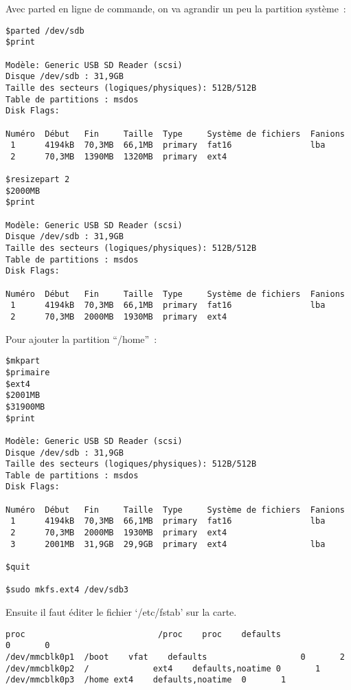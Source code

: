 Avec parted en ligne de commande, on va agrandir un peu la partition système~:
\begin{verbatim}
$parted /dev/sdb
$print

Modèle: Generic USB SD Reader (scsi)
Disque /dev/sdb : 31,9GB
Taille des secteurs (logiques/physiques): 512B/512B
Table de partitions : msdos
Disk Flags: 

Numéro  Début   Fin     Taille  Type     Système de fichiers  Fanions
 1      4194kB  70,3MB  66,1MB  primary  fat16                lba
 2      70,3MB  1390MB  1320MB  primary  ext4

$resizepart 2
$2000MB
$print

Modèle: Generic USB SD Reader (scsi)
Disque /dev/sdb : 31,9GB
Taille des secteurs (logiques/physiques): 512B/512B
Table de partitions : msdos
Disk Flags: 

Numéro  Début   Fin     Taille  Type     Système de fichiers  Fanions
 1      4194kB  70,3MB  66,1MB  primary  fat16                lba
 2      70,3MB  2000MB  1930MB  primary  ext4
\end{verbatim}

Pour ajouter la partition ``/home''~:

\begin{verbatim}
$mkpart
$primaire
$ext4
$2001MB
$31900MB
$print

Modèle: Generic USB SD Reader (scsi)
Disque /dev/sdb : 31,9GB
Taille des secteurs (logiques/physiques): 512B/512B
Table de partitions : msdos
Disk Flags: 

Numéro  Début   Fin     Taille  Type     Système de fichiers  Fanions
 1      4194kB  70,3MB  66,1MB  primary  fat16                lba
 2      70,3MB  2000MB  1930MB  primary  ext4
 3      2001MB  31,9GB  29,9GB  primary  ext4                 lba

$quit

$sudo mkfs.ext4 /dev/sdb3

\end{verbatim}

Ensuite il faut éditer le fichier `/etc/fstab' sur la carte.

\begin{verbatim}
proc                           /proc    proc    defaults                  0       0
/dev/mmcblk0p1  /boot    vfat    defaults                   0       2
/dev/mmcblk0p2  /             ext4    defaults,noatime 0       1
/dev/mmcblk0p3  /home ext4    defaults,noatime  0       1
\end{verbatim}

